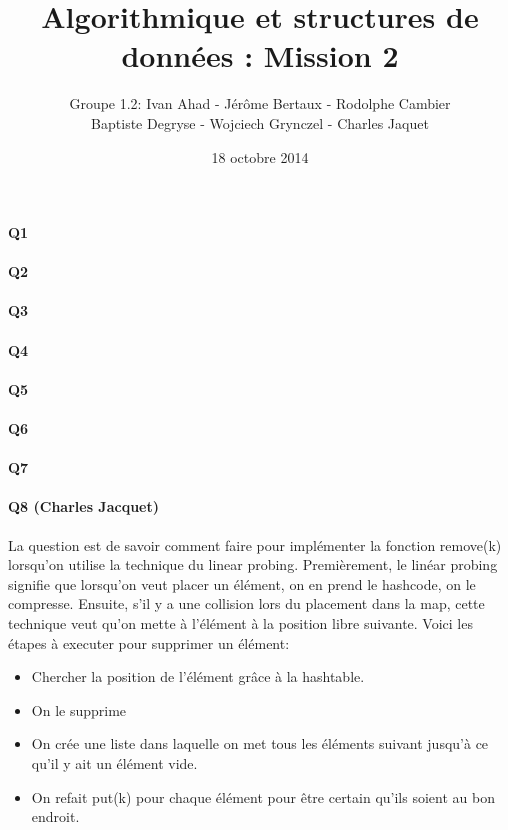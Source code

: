 \documentclass[a4paper]{article}
\title{Algorithmique et structures de données : Mission 2}
\date{18 octobre 2014}
\author{Groupe 1.2: Ivan Ahad - Jérôme Bertaux - Rodolphe Cambier \\ 
	Baptiste Degryse - Wojciech Grynczel - Charles Jaquet}
\begin{document}
\maketitle



\paragraph{Q1}

\paragraph{Q2}

\paragraph{Q3}

\paragraph{Q4}

\paragraph{Q5}

\paragraph{Q6}

\paragraph{Q7}

\paragraph{Q8 (Charles Jacquet)}
La question est de savoir comment faire pour implémenter la fonction remove(k) lorsqu'on utilise la technique du linear probing. Premièrement, le linéar probing signifie que lorsqu'on veut placer un élément, on en prend le hashcode, on le compresse. Ensuite, s'il y a une collision lors du placement dans la map, cette technique veut qu'on mette à l'élément à la position libre suivante. Voici les étapes à executer pour supprimer un élément:
\begin{itemize}
\item Chercher la position de l'élément grâce à la hashtable.
\item On le supprime
\item On crée une liste dans laquelle on met tous les éléments suivant jusqu'à ce qu'il y ait un élément vide.
\item On refait put(k) pour chaque élément pour être certain qu'ils soient au bon endroit.
\end{itemize}
\end{document}
